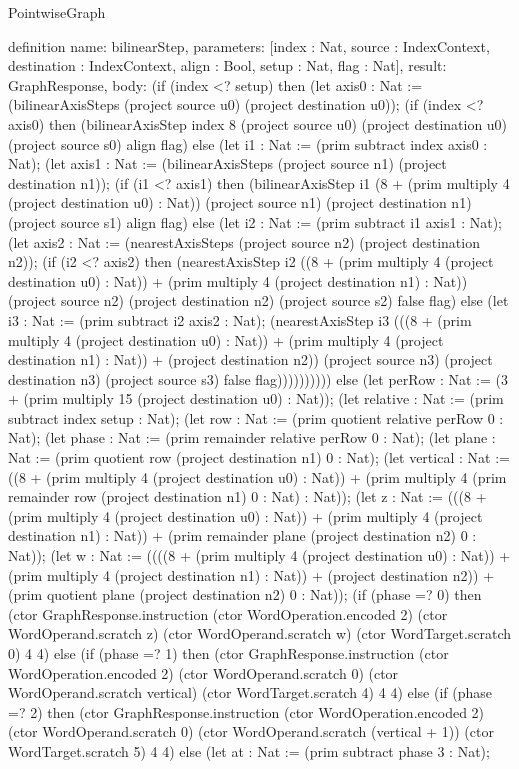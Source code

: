 \begin{lexlean}{PointwiseGraph}
\begin{semanticmodule}
definition{
  name: bilinearStep,
  parameters: [index : Nat, source : IndexContext, destination : IndexContext, align : Bool, setup : Nat, flag : Nat],
  result: GraphResponse,
  body: (if (index <? setup) then (let axis0 : Nat := (bilinearAxisSteps (project source u0) (project destination u0));
      (if (index <? axis0) then (bilinearAxisStep index 8 (project source u0) (project destination u0) (project source s0) align flag) else (let i1 : Nat := (prim subtract index axis0 : Nat);
      (let axis1 : Nat := (bilinearAxisSteps (project source n1) (project destination n1));
      (if (i1 <? axis1) then (bilinearAxisStep i1 (8 + (prim multiply 4 (project destination u0) : Nat)) (project source n1) (project destination n1) (project source s1) align flag) else (let i2 : Nat := (prim subtract i1 axis1 : Nat);
      (let axis2 : Nat := (nearestAxisSteps (project source n2) (project destination n2));
      (if (i2 <? axis2) then (nearestAxisStep i2 ((8 + (prim multiply 4 (project destination u0) : Nat)) + (prim multiply 4 (project destination n1) : Nat)) (project source n2) (project destination n2) (project source s2) false flag) else (let i3 : Nat := (prim subtract i2 axis2 : Nat);
      (nearestAxisStep i3 (((8 + (prim multiply 4 (project destination u0) : Nat)) + (prim multiply 4 (project destination n1) : Nat)) + (project destination n2)) (project source n3) (project destination n3) (project source s3) false flag)))))))))) else (let perRow : Nat := (3 + (prim multiply 15 (project destination u0) : Nat));
      (let relative : Nat := (prim subtract index setup : Nat);
      (let row : Nat := (prim quotient relative perRow 0 : Nat);
      (let phase : Nat := (prim remainder relative perRow 0 : Nat);
      (let plane : Nat := (prim quotient row (project destination n1) 0 : Nat);
      (let vertical : Nat := ((8 + (prim multiply 4 (project destination u0) : Nat)) + (prim multiply 4 (prim remainder row (project destination n1) 0 : Nat) : Nat));
      (let z : Nat := (((8 + (prim multiply 4 (project destination u0) : Nat)) + (prim multiply 4 (project destination n1) : Nat)) + (prim remainder plane (project destination n2) 0 : Nat));
      (let w : Nat := ((((8 + (prim multiply 4 (project destination u0) : Nat)) + (prim multiply 4 (project destination n1) : Nat)) + (project destination n2)) + (prim quotient plane (project destination n2) 0 : Nat));
      (if (phase =? 0) then (ctor GraphResponse.instruction (ctor WordOperation.encoded 2) (ctor WordOperand.scratch z) (ctor WordOperand.scratch w) (ctor WordTarget.scratch 0) 4 4) else (if (phase =? 1) then (ctor GraphResponse.instruction (ctor WordOperation.encoded 2) (ctor WordOperand.scratch 0) (ctor WordOperand.scratch vertical) (ctor WordTarget.scratch 4) 4 4) else (if (phase =? 2) then (ctor GraphResponse.instruction (ctor WordOperation.encoded 2) (ctor WordOperand.scratch 0) (ctor WordOperand.scratch (vertical + 1)) (ctor WordTarget.scratch 5) 4 4) else (let at : Nat := (prim subtract phase 3 : Nat);
}
\end{semanticmodule}
\end{lexlean}
